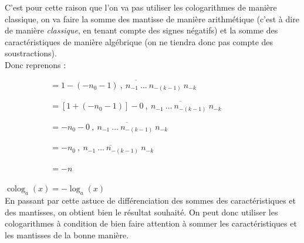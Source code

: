 \documentclass[a4paper, twoside]{article}
\begin{document}
	C'est pour cette raison que l'on va pas utiliser les cologarithmes de manière classique, on va faire la somme des mantisse de manière arithmétique (c'est à dire de manière \textit{classique}, en tenant compte des signes négatifs) et la somme des caractéristiques de manière algébrique (on ne tiendra donc pas compte des soustractions).\\

	Donc reprenons : 

	$\phantom{\operatorname{colog}_a (x)} = 1 - \overline{(-n_{0}-1)~,~n_{-1}~\dots~n_{-(k-1)}~
	n_{-k}}  $

	\vspace{2 mm}

	$\phantom{\operatorname{colog}_a (x)} = [1+(-n_{0}-1)] - \overline{0~,~n_{-1}~\dots~n_{-(k-1)}~
	n_{-k}}  $

	\vspace{2 mm}

	$\phantom{\operatorname{colog}_a (x)} = -n_{0} - \overline{0~,~n_{-1}~\dots~n_{-(k-1)}~
	n_{-k}}  $

	\vspace{2 mm}

	$\phantom{\operatorname{colog}_a (x)} = - \overline{n_{0}~,~n_{-1}~\dots~n_{-(k-1)}~
	n_{-k}}  $

	\vspace{2 mm}

	$\phantom{\operatorname{colog}_a (x)} = - n$

	\vspace{2 mm}

	$\operatorname{colog}_a (x) = -\log_a(x)$\\

	En passant par cette astuce de différenciation des sommes des caractéristiques et des mantisses, on obtient bien le résultat souhaité. On peut donc utiliser les cologarithmes à condition de bien faire attention à sommer les caractéristiques et les mantisses de la bonne manière.
\end{document}

